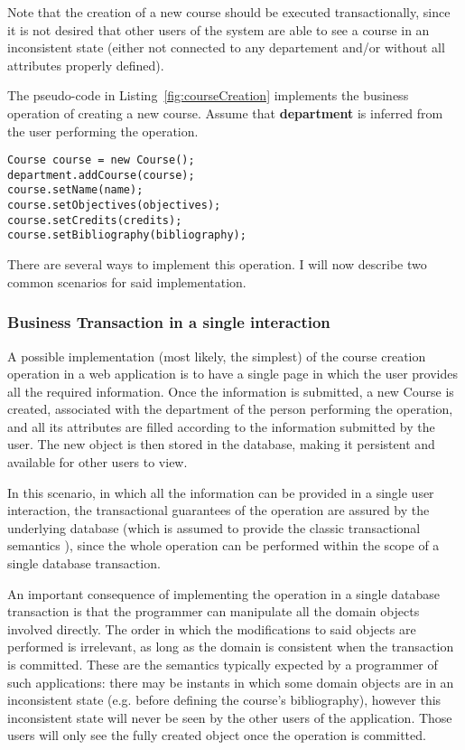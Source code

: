 \documentclass{llncs}
\begin{document}
Note that the creation of a new course should be executed
transactionally, since it is not desired that other users of the
system are able to see a course in an inconsistent state (either not
connected to any departement and/or without all attributes properly
defined).

The pseudo-code in Listing~\ref{fig:courseCreation} implements the
business operation of creating a new course. Assume that {\bf
  department} is inferred from the user performing the operation.

\begin{lstlisting}[float]
Course course = new Course();
department.addCourse(course);
course.setName(name);
course.setObjectives(objectives);
course.setCredits(credits);
course.setBibliography(bibliography);
\end{lstlisting}

There are several ways to implement this operation. I will now
describe two common scenarios for said implementation.

\subsubsection{Business Transaction in a single interaction}

A possible implementation (most likely, the simplest) of the course
creation operation in a web application is to have a single page in
which the user provides all the required information. Once the
information is submitted, a new Course is created, associated with the
department of the person performing the operation, and all its
attributes are filled according to the information submitted by the
user. The new object is then stored in the database, making it
persistent and available for other users to view.

In this scenario, in which all the information can be provided in a
single user interaction, the transactional guarantees of the operation
are assured by the underlying database (which is assumed to provide
the classic transactional semantics \cite{gray1981transaction}), since
the whole operation can be performed within the scope of a single
database transaction.

An important consequence of implementing the operation in a single
database transaction is that the programmer can manipulate all the
domain objects involved directly. The order in which the modifications
to said objects are performed is irrelevant, as long as the domain is
consistent when the transaction is committed. These are the semantics
typically expected by a programmer of such applications: there may be
instants in which some domain objects are in an inconsistent state
(e.g. before defining the course's bibliography), however this
inconsistent state will never be seen by the other users of the
application. Those users will only see the fully created object once
the operation is committed.
\end{document}
